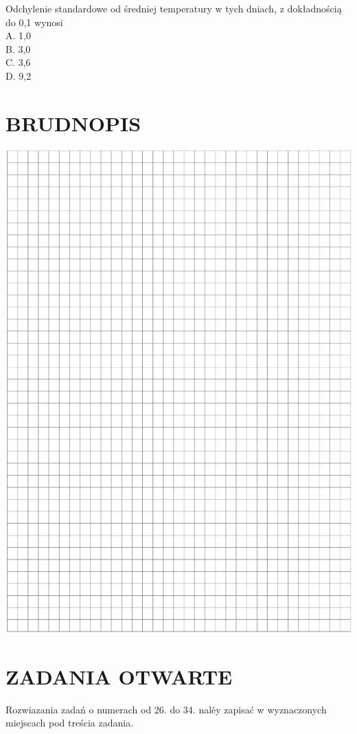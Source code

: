 \documentclass[10pt]{article}
\begin{document}
Odchylenie standardowe od średniej temperatury w tych dniach, z dokładnością do 0,1 wynosi\\
A. 1,0\\
B. 3,0\\
C. 3,6\\
D. 9,2

\section*{BRUDNOPIS}
\begin{center}
\includegraphics[max width=\textwidth]{2024_11_21_832f1bc2b626663f1df2g-09}
\end{center}

\section*{ZADANIA OTWARTE}
Rozwiazania zadań o numerach od 26. do 34. nalė̇y zapisać w wyznaczonych miejscach pod treścia zadania.
\end{document}

